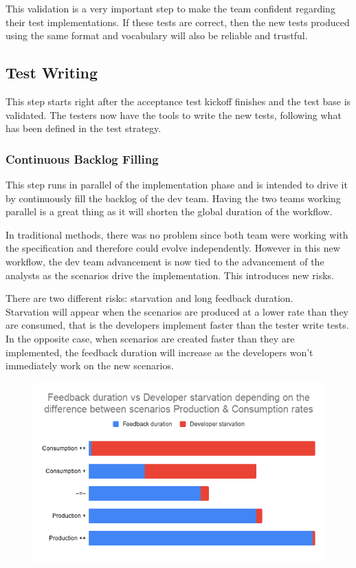 This validation is a very important step to make the team confident regarding
their test implementations.
If these tests are correct, then the new tests produced using the same format
and vocabulary will also be reliable and trustful.

\subsection{Test Writing}\label{subsec:test-writing}
This step starts right after the acceptance test kickoff finishes and the
test base is validated.
The testers now have the tools to write the new tests, following what
has been defined in the test strategy.

\subsubsection{Continuous Backlog Filling}
This step runs in parallel of the implementation phase and is intended to
drive it by continuously fill the backlog of the dev team.
Having the two teams working parallel is a great thing as it will shorten the
global duration of the workflow.

In traditional methods, there was no problem since both team were working
with the specification and therefore could evolve independently.
However in this new workflow, the dev team advancement is now tied to the
advancement of the analysts as the scenarios drive the implementation.
This introduces new risks.

There are two different risks: starvation and long feedback duration. \\
Starvation will appear when the scenarios are produced at a lower rate than
they are consumed, that is the developers implement faster than the tester
write tests. \\
In the opposite case, when scenarios are created faster than they are
implemented, the feedback duration will increase as the developers won't
immediately work on the new scenarios.

\begin{figure}
    \includegraphics[width=\textwidth]{../../resources/images/solution/feedback_vs_starvation.png}
    \centering
\end{figure}

